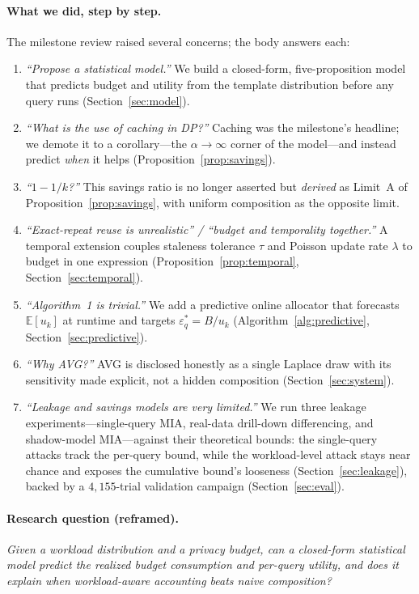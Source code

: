 \documentclass[sigconf,nonacm]{acmart}
\newcommand{\eps}{\varepsilon}
\newcommand{\E}{\mathbb{E}}
\begin{document}
\paragraph{What we did, step by step.}
The milestone review raised several concerns; the body answers each:
\begin{enumerate}
    \item \emph{``Propose a statistical model.''} We build a closed-form, five-proposition model that predicts budget and utility from the template distribution before any query runs (Section~\ref{sec:model}).
    \item \emph{``What is the use of caching in DP?''} Caching was the milestone's headline; we demote it to a corollary---the $\alpha\to\infty$ corner of the model---and instead predict \emph{when} it helps (Proposition~\ref{prop:savings}).
    \item \emph{``$1-1/k$?''} This savings ratio is no longer asserted but \emph{derived} as Limit~A of Proposition~\ref{prop:savings}, with uniform composition as the opposite limit.
    \item \emph{``Exact-repeat reuse is unrealistic'' / ``budget and temporality together.''} A temporal extension couples staleness tolerance $\tau$ and Poisson update rate $\lambda$ to budget in one expression (Proposition~\ref{prop:temporal}, Section~\ref{sec:temporal}).
    \item \emph{``Algorithm~1 is trivial.''} We add a predictive online allocator that forecasts $\E[u_k]$ at runtime and targets $\eps_q^\ast=B/u_k$ (Algorithm~\ref{alg:predictive}, Section~\ref{sec:predictive}).
    \item \emph{``Why AVG?''} AVG is disclosed honestly as a single Laplace draw with its sensitivity made explicit, not a hidden composition (Section~\ref{sec:system}).
    \item \emph{``Leakage and savings models are very limited.''} We run three leakage experiments---single-query MIA, real-data drill-down differencing, and shadow-model MIA---against their theoretical bounds: the single-query attacks track the per-query bound, while the workload-level attack stays near chance and exposes the cumulative bound's looseness (Section~\ref{sec:leakage}), backed by a $4{,}155$-trial validation campaign (Section~\ref{sec:eval}).
\end{enumerate}

\paragraph{Research question (reframed).}
\emph{Given a workload distribution and a privacy budget, can a closed-form statistical model predict the realized budget consumption and per-query utility, and does it explain when workload-aware accounting beats naive composition?}
\end{document}
